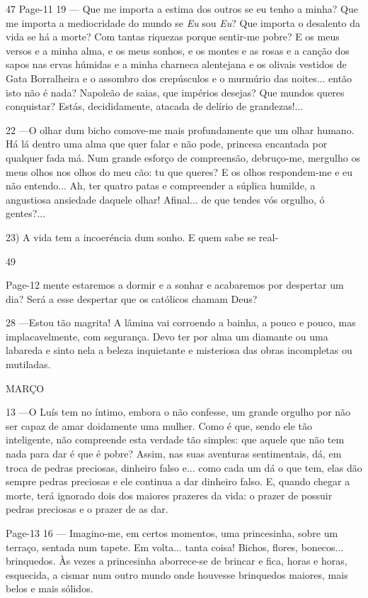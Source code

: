 47
Page-11
19 — Que me importa a estima dos outros se eu tenho
a minha? Que me importa a mediocridade do mundo
se \textit{Eu} sou \textit{Eu}? Que importa o desalento da vida se há
a morte? Com tantas riquezas porque sentir-me pobre?
E os meus versos e a minha alma, e os meus sonhos,
e os montes e as rosas e a canção dos sapos nas ervas
húmidas e a minha charneca alentejana e os olivais
vestidos de Gata Borralheira e o assombro dos 
crepúsculos e o murmúrio das noites... então isto não é
nada? Napoleão de saias, que impérios desejas? Que
mundos queres conquistar? Estás, decididamente, 
atacada de delírio de grandezas!...

22 —O olhar dum bicho comove-me mais 
profundamente que um olhar humano. Há lá dentro 
uma alma que quer falar e não pode, princesa encantada
por qualquer fada má. Num grande esforço de compreensão,
debruço-me, mergulho os meus olhos nos olhos do
meu cão: tu que queres? E os olhos respondem-me e
eu não entendo... Ah, ter quatro patas e compreender
a súplica humilde, a angustiosa ansiedade daquele
olhar! Afinal... de que tendes vós orgulho, ó gentes?...

23)
A vida tem a incoeréncia dum sonho. E quem sabe se real-

49


Page-12
mente estaremos a dormir e a sonhar e acabaremos por
despertar um dia? Será a esse despertar que os católicos
chamam Deus?

28 —Estou tão magrita! A lâmina vai corroendo a
bainha, a pouco e pouco, mas implacavelmente, com
segurança. Devo ter por alma um diamante ou uma
labareda e sinto nela a beleza inquietante e misteriosa
das obras incompletas ou mutiladas.

MARÇO

13 —O Luís tem no íntimo, embora o não confesse,
um grande orgulho por não ser capaz de amar 
doidamente uma mulher. Como é que, sendo ele tão 
inteligente, não compreende esta verdade tão simples: que
aquele que não tem nada para dar é que é pobre? Assim,
nas suas aventuras sentimentais, dá, em troca de pedras
preciosas, dinheiro falso e... como cada um dá o que
tem, elas dão sempre pedras preciosas e ele continua a
dar dinheiro falso. E, quando chegar a morte, terá
ignorado dois dos maiores prazeres da vida: o prazer de
possuir pedras preciosas e o prazer de as dar.


Page-13
16 — Imagino-me, em certos momentos, uma 
princesinha, sobre um terraço, sentada num tapete. Em volta...
tanta coisa! Bichos, flores, bonecos... brinquedos. Às
vezes a princesinha aborrece-se de brincar e fica, horas
e horas, esquecida, a cismar num outro mundo onde
houvesse brinquedos maiores, mais belos e mais
sólidos.

